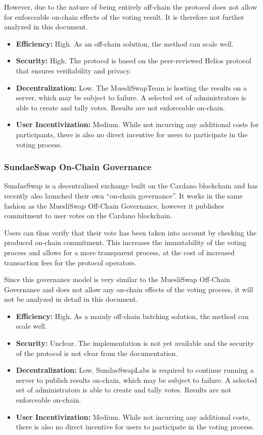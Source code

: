 \documentclass[11pt]{article}
\begin{document}
However, due to the nature of being entirely off-chain the protocol does not allow for enforceable on-chain effects of the voting result.
It is therefore not further analyzed in this document.

\begin{itemize}
    \item \textbf{Efficiency:} High. As an off-chain solution, the method can scale well.
    \item \textbf{Security:} High. The protocol is based on the peer-reviewed Helios protocol that ensures verifiability and privacy.
    \item \textbf{Decentralization:} Low. The MuesliSwapTeam is hosting the results on a server, which may be subject to failure. A selected set of administrators is able to create and tally votes. Results are not enforceable on-chain.
    \item \textbf{User Incentivization:} Medium. While not incurring any additional costs for participants, there is also no direct incentive for users to participate in the voting process.
\end{itemize}

\subsubsection{SundaeSwap On-Chain Governance}

SundaeSwap is a decentralized exchange built on the Cardano blockchain
and has recently also launched their own ``on-chain governance''\cite{Labs-2023}.
It works in the same fashion as the MuesliSwap Off-Chain Governance,
however it publishes commitment to user votes on the Cardano blockchain.

Users can thus verify that their vote has been taken into account by checking the produced on-chain commitment.
This increases the immutability of the voting process and allows for a more transparent process,
at the cost of increased transaction fees for the protocol operators.

Since this governance model is very similar to the MuesliSwap Off-Chain Governance and does not allow
any on-chain effects of the voting process, it will not be analyzed in detail in this document.

\begin{itemize}
    \item \textbf{Efficiency:} High. As a mainly off-chain batching solution, the method can scale well.
    \item \textbf{Security:} Unclear. The implementation is not yet available and the security of the protocol is not clear from the documentation.
    \item \textbf{Decentralization:} Low. SundaeSwapLabs is required to continue running a server to publish results on-chain, which may be subject to failure. A selected set of administrators is able to create and tally votes. Results are not enforceable on-chain.
    \item \textbf{User Incentivization:} Medium. While not incurring any additional costs, there is also no direct incentive for users to participate in the voting process.
\end{itemize}
\end{document}
